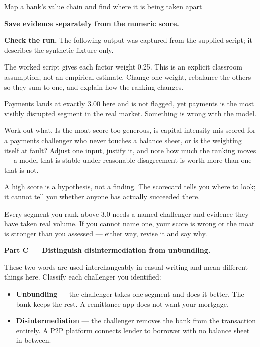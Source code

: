 \begin{labproject}{Map a bank's value chain and find where it is being taken apart}


\noindent\textbf{Save evidence separately from the numeric score.}


\textbf{Check the run.} The following output was captured from the supplied script; it describes the synthetic fixture only.



The worked script gives each factor weight 0.25. This is an explicit classroom assumption, not an empirical estimate. Change one weight, rebalance the others so they sum to one, and explain how the ranking changes.

\begin{tryit}
Payments lands at exactly 3.00 here and is not flagged, yet payments is the most visibly disrupted segment in the real market. Something is wrong with the model.

Work out what. Is the moat score too generous, is capital intensity mis-scored for a payments challenger who never touches a balance sheet, or is the weighting itself at fault? Adjust one input, justify it, and note how much the ranking moves --- a model that is stable under reasonable disagreement is worth more than one that is not.
\end{tryit}

\begin{pitfall}
A high score is a hypothesis, not a finding. The scorecard tells you where to look; it cannot tell you whether anyone has actually succeeded there.

Every segment you rank above 3.0 needs a named challenger and evidence they have taken real volume. If you cannot name one, your score is wrong or the moat is stronger than you assessed --- either way, revise it and say why.
\end{pitfall}

\medskip\noindent\textbf{Part C --- Distinguish disintermediation from unbundling.}\par
These two words are used interchangeably in casual writing and mean different things here. Classify each challenger you identified:

\begin{itemize}
  \item \textbf{Unbundling} --- the challenger takes one segment and does it better. The bank keeps the rest. A remittance app does not want your mortgage.
  \item \textbf{Disintermediation} --- the challenger removes the bank from the transaction entirely. A P2P platform connects lender to borrower with no balance sheet in between.
\end{itemize}


\end{labproject}
